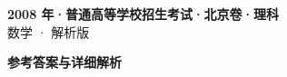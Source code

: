 \documentclass[zihao=-4, a4paper]{ctexart}
\begin{document}
\begin{center}
  {\Large\bfseries 2008 年·普通高等学校招生考试·北京卷·理科}\\[4pt]
  {\large 数学 · 解析版}
\end{center}
\medskip
{}

\clearpage
{}
\begin{center}{\Large\bfseries 参考答案与详细解析}\end{center}
\medskip

\end{document}
